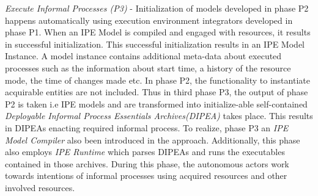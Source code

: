 \textit{Execute Informal Processes (P3)} - Initialization of models developed in phase P2 happens automatically using execution environment integrators developed in phase P1. When an IPE Model is compiled and engaged with resources, it results in successful initialization. This successful initialization results in an IPE Model Instance. A model instance contains additional meta-data about executed processes such as the information about start time, a history of the resource mode, the time of changes made etc. In phase P2, the functionality to instantiate acquirable entities are not included. Thus in third phase P3, the output of phase P2 is taken i.e IPE models and are transformed into initialize-able self-contained \textit{Deployable Informal Process Essentials Archives(DIPEA)} \cite{Sungur2015} takes place. This results in DIPEAs enacting required informal process. To realize, phase P3 an \textit{IPE Model Compiler} also been introduced in the approach. Additionally, this phase also employs \textit{IPE Runtime} which parses DIPEAs and runs the executables contained in those archives. During this phase, the autonomous actors work towards intentions of informal processes using acquired resources and other involved resources.  











